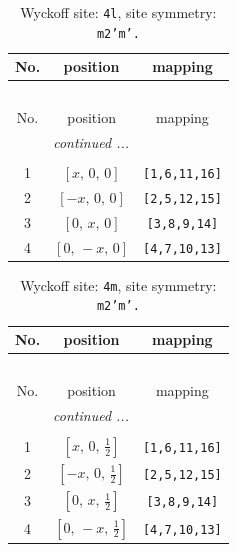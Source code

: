 \documentclass[fleqn,8pt]{jsarticle}
\begin{document}
\renewcommand{\arraystretch}{1.2}
\begin{longtable}{ccc}
\caption{Wyckoff site: {\tt 4l}, site symmetry: {\tt m2'm'.}}
 \\
 \hline \hline
No. & position & mapping \\ \hline \endfirsthead

\multicolumn{2}{l}{\tablename\ \thetable{}} \\
 \hline \hline
No. & position & mapping \\ \hline \endhead

 \hline \hline
\multicolumn{2}{r}{\footnotesize\it continued ...} \\ \endfoot

 \hline \hline
\multicolumn{2}{r}{} \\ \endlastfoot

1 & $\left[ x,\, 0,\, 0 \right]$ & {\tt [1,6,11,16]} \\ \hline
2 & $\left[ - x,\, 0,\, 0 \right]$ & {\tt [2,5,12,15]} \\ \hline
3 & $\left[ 0,\, x,\, 0 \right]$ & {\tt [3,8,9,14]} \\ \hline
4 & $\left[ 0,\, - x,\, 0 \right]$ & {\tt [4,7,10,13]} \\
\end{longtable}
\renewcommand{\arraystretch}{1.2}
\begin{longtable}{ccc}
\caption{Wyckoff site: {\tt 4m}, site symmetry: {\tt m2'm'.}}
 \\
 \hline \hline
No. & position & mapping \\ \hline \endfirsthead

\multicolumn{2}{l}{\tablename\ \thetable{}} \\
 \hline \hline
No. & position & mapping \\ \hline \endhead

 \hline \hline
\multicolumn{2}{r}{\footnotesize\it continued ...} \\ \endfoot

 \hline \hline
\multicolumn{2}{r}{} \\ \endlastfoot

1 & $\left[ x,\, 0,\, \frac{1}{2} \right]$ & {\tt [1,6,11,16]} \\ \hline
2 & $\left[ - x,\, 0,\, \frac{1}{2} \right]$ & {\tt [2,5,12,15]} \\ \hline
3 & $\left[ 0,\, x,\, \frac{1}{2} \right]$ & {\tt [3,8,9,14]} \\ \hline
4 & $\left[ 0,\, - x,\, \frac{1}{2} \right]$ & {\tt [4,7,10,13]} \\
\end{longtable}
\end{document}
